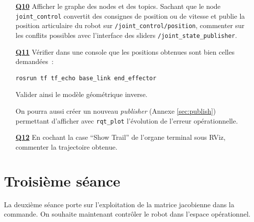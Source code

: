 \documentclass[12pt,a4paper]{article}
\begin{document}
\begin{itemize}
\medskip\item[\textbf{\underline{Q10}}] Afficher le graphe des nodes et des topics. Sachant que le node \texttt{joint\_control} convertit des consignes de position ou de vitesse et publie la position articulaire du robot sur \texttt{/joint\_control/position}, commenter sur les conflits possibles avec l'interface des sliders \texttt{/joint\_state\_publisher}.

\medskip\item[\textbf{\underline{Q11}}]  Vérifier dans une console que les positions obtenues sont bien celles demandées~:
\begin{verbatim}
rosrun tf tf_echo base_link end_effector
\end{verbatim}Valider ainsi le modèle géométrique inverse. 

On pourra aussi créer un nouveau \emph{publisher} (Annexe \ref{sec:publish}) permettant d'afficher avec \texttt{rqt\_plot} l'évolution de l'erreur opérationnelle.

\medskip\item[\textbf{\underline{Q12}}] En cochant la case ``Show Trail'' de l'organe terminal sous RViz, commenter la trajectoire obtenue.

\end{itemize}

\newpage

\section{Troisième séance}

La deuxième séance porte sur l'exploitation de la matrice jacobienne dans la commande. On souhaite maintenant contrôler le robot dans l'espace opérationnel.
\end{document}

